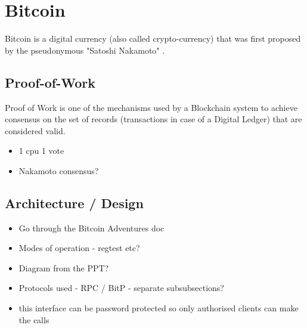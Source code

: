 
\section{Bitcoin} \label{intro-bitcoin}

Bitcoin is a digital currency (also called crypto-currency) that was first proposed by the pseudonymous "Satoshi Nakamoto" \cite{bitcoinOriginal}.


\newpage
\subsection{Proof-of-Work} \label{btc-pow}

Proof of Work is one of the mechanisms used by a Blockchain system to achieve consensus on the set of records (transactions in case of a Digital Ledger) that are considered valid. 


\begin{itemize}
    \item 1 cpu 1 vote
    \item Nakamoto consensus?
\end{itemize}


\newpage
\subsection{Architecture / Design} \label{btc-arch}

\begin{itemize}
    \item Go through the Bitcoin Adventures doc
    \item Modes of operation - regtest etc?
    \item Diagram from the PPT?
    \item Protocols used - RPC / BitP - separate subsubsections? 
    \item this interface can be password protected so only authorised clients can make the calls
\end{itemize}

